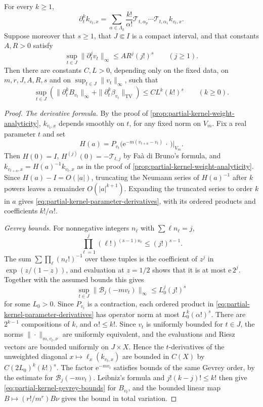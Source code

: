 \begin{theorem}\label{thm:partial-kernel-parameter-derivatives}
For every $k\geq1$,
\begin{equation}\label{eq:partial-kernel-parameter-derivatives}
 \partial_t^k k_{v_t,x}
 =\sum_{\alpha\in\Lambda_k}\frac{k!}{\alpha!}
       \mathcal T_{t,\alpha_p}\cdots
       \mathcal T_{t,\alpha_1}k_{v_t,x}.
\end{equation}
Suppose moreover that $s\geq1$, that $J\Subset I$ is a compact interval, and that constants $A,R>0$ satisfy
\[
 \sup_{t\in J}\|\partial_t^jv_t\|_\infty
 \leq AR^j(j!)^s\qquad(j\geq1).
\]
Then there are constants $C,L>0$, depending only on the fixed data, on $m,r,J,A,R,s$ and on $\sup_{t\in J}\|v_t\|_\infty$, such that
\begin{equation}\label{eq:partial-kernel-gevrey-bounds}
 \sup_{t\in J}
 \left(\|\partial_t^kB_{v_t}\|_\infty
       +\|\partial_t^k\beta_{v_t}\|_{\mathrm{TV}}\right)
 \leq CL^k(k!)^s\qquad(k\geq0).
\end{equation}
\end{theorem}
\begin{proof}
\emph{The derivative formula.} By the proof of \cref{prop:partial-kernel-weight-analyticity}, $k_{v_t,x}$ depends smoothly on $t$, for any fixed norm on $V_m$. Fix a real parameter $t$ and set
\[
 H(a)=P_{v_t}\bigl(\mathrm{e}^{-m(v_{t+a}-v_t)}\,\cdot\,\bigr)|_{V_m}.
\]
Then $H(0)=I$, $H^{(j)}(0)=-\mathcal T_{t,j}$ by Fa\`a di Bruno's formula, and
$k_{v_{t+a},x}=H(a)^{-1}k_{v_t,x}$ as in the proof of \cref{prop:partial-kernel-weight-analyticity}. Since $H(a)-I=O(|a|)$, truncating the Neumann series of $H(a)^{-1}$ after $k$ powers leaves a remainder $O(|a|^{k+1})$. Expanding the truncated series to order $k$ in $a$ gives \eqref{eq:partial-kernel-parameter-derivatives}, with its ordered products and coefficients $k!/\alpha!$.

\emph{Gevrey bounds.} For nonnegative integers $n_\ell$ with $\sum\ell n_\ell=j$,
\[
 \prod_{\ell=1}^j(\ell!)^{(s-1)n_\ell}
 \leq(j!)^{s-1}.
\]
The sum $\sum\prod_\ell(n_\ell!)^{-1}$ over these tuples is the coefficient of $z^j$ in $\exp(z/(1-z))$, and evaluation at $z=1/2$ shows that it is at most $\mathrm{e}\,2^j$. Together with the assumed bounds this gives
\[
 \sup_{t\in J}\|\mathcal B_j(-mv_t)\|_\infty
 \leq L_0^j(j!)^s
\]
for some $L_0>0$. Since $P_{v_t}$ is a contraction, each ordered product in \eqref{eq:partial-kernel-parameter-derivatives} has operator norm at most $L_0^k(\alpha!)^s$. There are $2^{k-1}$ compositions of $k$, and $\alpha!\leq k!$. Since $v_t$ is uniformly bounded for $t\in J$, the norms $\|\cdot\|_{m,v_t,\nu}$ are uniformly equivalent, and the evaluations and Riesz vectors are bounded uniformly on $J\times X$. Hence the $t$-derivatives of the unweighted diagonal $x\mapsto\ell_x(k_{v_t,x})$ are bounded in $C(X)$ by $C(2L_0)^k(k!)^s$. The factor $\mathrm{e}^{-mv_t}$ satisfies bounds of the same Gevrey order, by the estimate for $\mathcal B_j(-mv_t)$. Leibniz's formula and $j!(k-j)!\leq k!$ then give \eqref{eq:partial-kernel-gevrey-bounds} for $B_{v_t}$, and the bounded linear map $B\mapsto(r!/m^r)B\nu$ gives the bound in total variation.
\end{proof}


